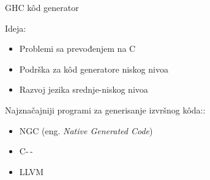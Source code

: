 \documentclass{beamer}
\begin{document}
\begin{frame}{GHC k\^{o}d generator}
	
	Ideja:
	
	\begin{itemize}
		\item Problemi sa prevođenjem na C
		\item Podrška za k\^{o}d generatore niskog nivoa
		\item Razvoj jezika srednje-niskog nivoa
	\end{itemize}
	
	Najznačajniji programi za generisanje izvršnog k\^{o}da::
	
	\begin{itemize}
		\item  NGC (eng. \emph{Native Generated Code})%
		\item  C-\,- %
		\item LLVM %
		
	\end{itemize}
	
	
\end{frame}
\end{document}
